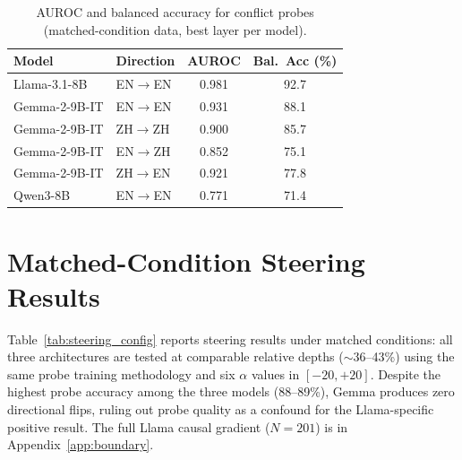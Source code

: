\documentclass[11pt]{article}
\begin{document}
\begin{table}[!t]
\centering
\caption{AUROC and balanced accuracy for conflict probes (matched-condition data, best layer per model).}
\label{tab:auroc}
\small
\begin{tabular}{llcc}
\toprule
Model & Direction & AUROC & Bal.\ Acc (\%) \\
\midrule
Llama-3.1-8B & EN$\to$EN & 0.981 & 92.7 \\
\midrule
Gemma-2-9B-IT & EN$\to$EN & 0.931 & 88.1 \\
Gemma-2-9B-IT & ZH$\to$ZH & 0.900 & 85.7 \\
Gemma-2-9B-IT & EN$\to$ZH & 0.852 & 75.1 \\
Gemma-2-9B-IT & ZH$\to$EN & 0.921 & 77.8 \\
\midrule
Qwen3-8B & EN$\to$EN & 0.771 & 71.4 \\
\bottomrule
\end{tabular}
\end{table}

\section{Matched-Condition Steering Results}
\label{app:steering_config}

Table~\ref{tab:steering_config} reports steering results under matched conditions: all three architectures are tested at comparable relative depths (${\sim}$36--43\%) using the same probe training methodology and six $\alpha$ values in $[-20, +20]$.
Despite the highest probe accuracy among the three models (88--89\%), Gemma produces zero directional flips, ruling out probe quality as a confound for the Llama-specific positive result.
The full Llama causal gradient ($N = 201$) is in Appendix~\ref{app:boundary}.
\end{document}
